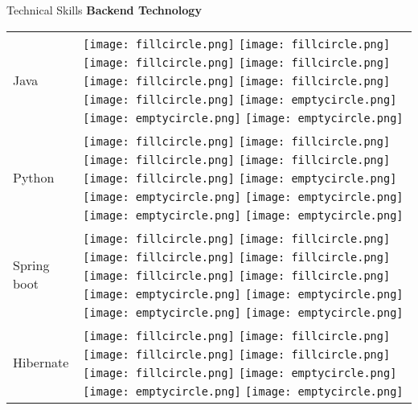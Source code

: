 \documentclass{resume}
\begin{document}
\begin{rSection}{Technical Skills}
{\bf Backend Technology}
\begin{table}[h!]
  \begin{tabular}{p{10cm}p{6cm}}
  Java & 
  \texttt{[image: fillcircle.png]} 
  \texttt{[image: fillcircle.png]} 
  \texttt{[image: fillcircle.png]}
  \texttt{[image: fillcircle.png]} 
  \texttt{[image: fillcircle.png]}
  \texttt{[image: fillcircle.png]} 
  \texttt{[image: fillcircle.png]}
  \texttt{[image: emptycircle.png]} 
  \texttt{[image: emptycircle.png]} 
  \texttt{[image: emptycircle.png]} \\
  Python & 
  \texttt{[image: fillcircle.png]} 
  \texttt{[image: fillcircle.png]} 
  \texttt{[image: fillcircle.png]}
  \texttt{[image: fillcircle.png]} 
  \texttt{[image: fillcircle.png]}
  \texttt{[image: emptycircle.png]} 
  \texttt{[image: emptycircle.png]}
  \texttt{[image: emptycircle.png]} 
  \texttt{[image: emptycircle.png]} 
  \texttt{[image: emptycircle.png]} \\
  Spring boot & 
  \texttt{[image: fillcircle.png]} 
  \texttt{[image: fillcircle.png]} 
  \texttt{[image: fillcircle.png]}
  \texttt{[image: fillcircle.png]} 
  \texttt{[image: fillcircle.png]}
  \texttt{[image: fillcircle.png]} 
  \texttt{[image: emptycircle.png]}
  \texttt{[image: emptycircle.png]} 
  \texttt{[image: emptycircle.png]} 
  \texttt{[image: emptycircle.png]} \\
  Hibernate & 
  \texttt{[image: fillcircle.png]} 
  \texttt{[image: fillcircle.png]} 
  \texttt{[image: fillcircle.png]}
  \texttt{[image: fillcircle.png]} 
  \texttt{[image: fillcircle.png]}
  \texttt{[image: emptycircle.png]} 
  \texttt{[image: emptycircle.png]}
  \texttt{[image: emptycircle.png]} 

\end{tabular}
\end{table}
\end{rSection}
\end{document}
